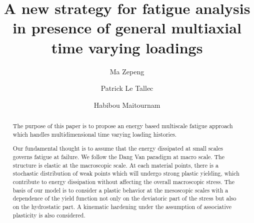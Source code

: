 \documentclass[3p,times,number,review]{elsarticle}
\begin{document}
\begin{frontmatter}



\title{A new strategy for fatigue analysis in presence of general multiaxial time varying loadings}




\author[a]{Ma Zepeng}
\author[b]{Patrick Le Tallec}
\author[c]{Habibou Maitournam}

\address[a]{Laboratory of Solid Mechanics, Ecole Polytechnique, 91128 Palaiseau Cedex, France}
\address[b]{Laboratory of Solid Mechanics, Ecole Polytechnique, 91128 Palaiseau Cedex, France}
\address[c]{IMSIA, ENSTA ParisTech, CNRS, CEA, EDF, Université Paris-Saclay, 828 bd des Maréchaux, 91762 Palaiseau cedex France}

\begin{abstract}
The purpose of this paper is to propose an energy based multiscale fatigue approach which handles multidimensional time varying loading histories.

Our fundamental thought is to assume that the energy dissipated at small scales governs fatigue at failure. We follow the Dang Van paradigm at macro scale. The structure is elastic at the macroscopic scale. At each material points, there is a stochastic distribution of weak points which will undergo strong plastic yielding, which contribute to energy dissipation without affecting the overall macroscopic stress. The basis of our model is to consider a plastic behavior at the mesoscopic scales with a dependence of the yield function not only on the deviatoric part of the stress but also on the hydrostatic part. A kinematic hardening under the assumption of associative plasticity is also considered. 


\end{abstract}
\end{frontmatter}
\end{document}
